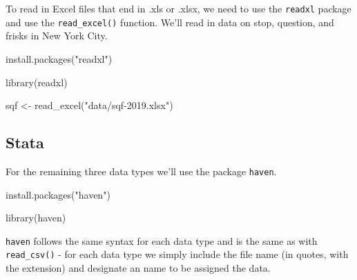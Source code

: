 \documentclass[
]{krantz}
\makeatletter
\newenvironment{Shaded}{\begin{snugshade}}{\end{snugshade}}
\newcommand{\FunctionTok}[1]{\textcolor[rgb]{0,0,0}{#1}}
\newcommand{\NormalTok}[1]{#1}
\newcommand{\OtherTok}[1]{\textcolor[rgb]{0.37,0.37,0.37}{#1}}
\newcommand{\StringTok}[1]{\textcolor[rgb]{0.5,0.5,0.5}{#1}}
\newenvironment{kframe}{%
\medskip{}
\setlength{\fboxsep}{.8em}
 \def\at@end@of@kframe{}%
 \ifinner\ifhmode%
  \def\at@end@of@kframe{\end{minipage}}%
  \begin{minipage}{\columnwidth}%
 \fi\fi%
 \def\FrameCommand##1{\hskip\@totalleftmargin \hskip-\fboxsep
 \colorbox{shadecolor}{##1}\hskip-\fboxsep
     \hskip-\linewidth \hskip-\@totalleftmargin \hskip\columnwidth}%
 \MakeFramed {\advance\hsize-\width
   \@totalleftmargin\z@ \linewidth\hsize
   \@setminipage}}%
 {\par\unskip\endMakeFramed%
 \at@end@of@kframe}
\renewenvironment{Shaded}{\begin{kframe}}{\end{kframe}}
\makeatother
\begin{document}
To read in Excel files that end in .xls or .xlsx, we need to use the \texttt{readxl} package and use the \texttt{read\_excel()} function. We'll read in data on stop, question, and frisks in New York City.

\begin{Shaded}
\begin{Highlighting}[]
\FunctionTok{install.packages}\NormalTok{(}\StringTok{"readxl"}\NormalTok{)}
\end{Highlighting}
\end{Shaded}

\begin{Shaded}
\begin{Highlighting}[]
\FunctionTok{library}\NormalTok{(readxl)}
\end{Highlighting}
\end{Shaded}

\begin{Shaded}
\begin{Highlighting}[]
\NormalTok{sqf }\OtherTok{\textless{}{-}} \FunctionTok{read\_excel}\NormalTok{(}\StringTok{"data/sqf{-}2019.xlsx"}\NormalTok{)}
\end{Highlighting}
\end{Shaded}

\hypertarget{stata}{%
\subsection{Stata}\label{stata}}

For the remaining three data types we'll use the package \texttt{haven}.

\begin{Shaded}
\begin{Highlighting}[]
\FunctionTok{install.packages}\NormalTok{(}\StringTok{"haven"}\NormalTok{)}
\end{Highlighting}
\end{Shaded}

\begin{Shaded}
\begin{Highlighting}[]
\FunctionTok{library}\NormalTok{(haven)}
\end{Highlighting}
\end{Shaded}

\texttt{haven} follows the same syntax for each data type and is the same as with \texttt{read\_csv()} - for each data type we simply include the file name (in quotes, with the extension) and designate an name to be assigned the data.
\end{document}
